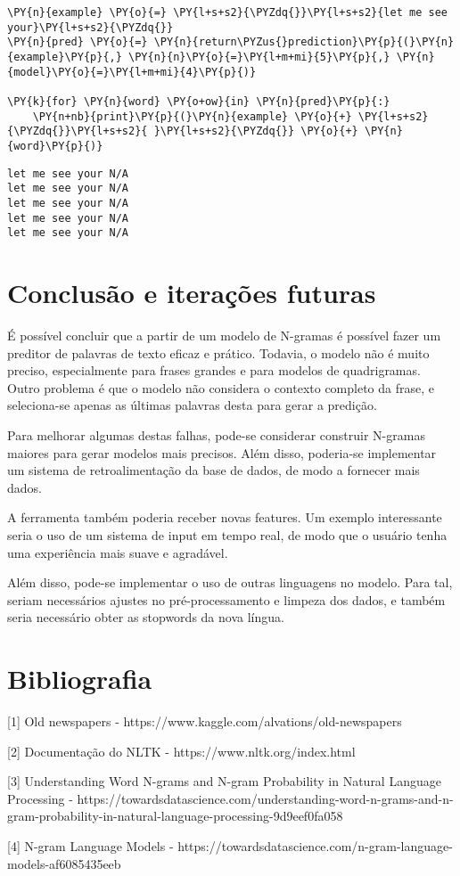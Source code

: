 \documentclass[a4paper,11pt,final]{article}
\begin{document}
\begin{Verbatim}[commandchars=\\\{\},frame=single,fontsize=\small, xleftmargin=0.5em]
\PY{n}{example} \PY{o}{=} \PY{l+s+s2}{\PYZdq{}}\PY{l+s+s2}{let me see your}\PY{l+s+s2}{\PYZdq{}}
\PY{n}{pred} \PY{o}{=} \PY{n}{return\PYZus{}prediction}\PY{p}{(}\PY{n}{example}\PY{p}{,} \PY{n}{n}\PY{o}{=}\PY{l+m+mi}{5}\PY{p}{,} \PY{n}{model}\PY{o}{=}\PY{l+m+mi}{4}\PY{p}{)}

\PY{k}{for} \PY{n}{word} \PY{o+ow}{in} \PY{n}{pred}\PY{p}{:}
    \PY{n+nb}{print}\PY{p}{(}\PY{n}{example} \PY{o}{+} \PY{l+s+s2}{\PYZdq{}}\PY{l+s+s2}{ }\PY{l+s+s2}{\PYZdq{}} \PY{o}{+} \PY{n}{word}\PY{p}{)}
\end{Verbatim}

\begin{Verbatim}[commandchars=\\\{\},frame=leftline,fontsize=\small, xleftmargin=0.5em]
let me see your N/A
let me see your N/A
let me see your N/A
let me see your N/A
let me see your N/A
\end{Verbatim}


\section{Conclusão e iterações futuras}

É possível concluir que a partir de um modelo de N-gramas é possível fazer um preditor de palavras de texto eficaz e prático.
Todavia, o modelo não é muito preciso, especialmente para frases grandes e para modelos de quadrigramas. 
Outro problema é que o modelo não considera o contexto completo da frase, e seleciona-se apenas as últimas palavras desta para gerar a predição.

Para melhorar algumas destas falhas, pode-se considerar construir N-gramas maiores para gerar modelos mais precisos.
Além disso, poderia-se implementar um sistema de retroalimentação da base de dados, de modo a fornecer mais dados.

A ferramenta também poderia receber novas features. Um exemplo interessante seria o uso de um sistema de input em tempo real, de modo que o usuário tenha uma experiência mais suave e agradável.

Além disso, pode-se implementar o uso de outras linguagens no modelo. 
Para tal, seriam necessários ajustes no pré-processamento e limpeza dos dados, e também seria necessário obter as stopwords da nova língua.

\section{Bibliografia}

[1] Old newspapers - https://www.kaggle.com/alvations/old-newspapers

[2] Documentação do NLTK - https://www.nltk.org/index.html

[3] Understanding Word N-grams and N-gram Probability in Natural Language Processing - https://towardsdatascience.com/understanding-word-n-grams-and-n-gram-probability-in-natural-language-processing-9d9eef0fa058

[4] N-gram Language Models - https://towardsdatascience.com/n-gram-language-models-af6085435eeb
\end{document}
